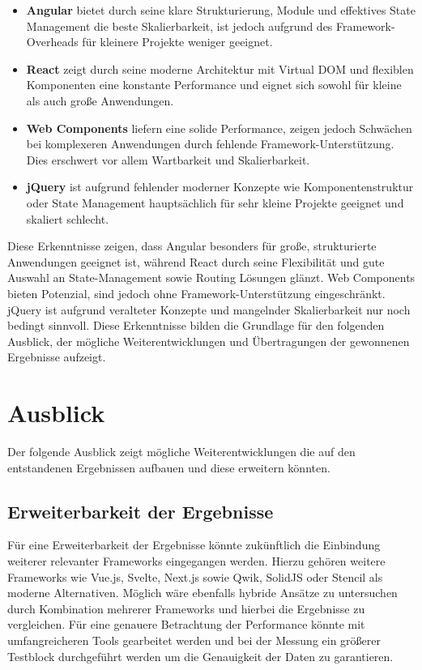 \documentclass[oneside]{ausarbeitung}
\begin{document}
\begin{itemize}
    \item \textbf{Angular} bietet durch seine klare Strukturierung, Module und effektives State Management die beste Skalierbarkeit, ist jedoch aufgrund des Framework-Overheads für kleinere Projekte weniger geeignet.
    \item \textbf{React} zeigt durch seine moderne Architektur mit Virtual DOM und flexiblen Komponenten eine konstante Performance und eignet sich sowohl für kleine als auch große Anwendungen.
    \item \textbf{Web Components} liefern eine solide Performance, zeigen jedoch Schwächen bei komplexeren Anwendungen durch fehlende Framework-Unterstützung. Dies erschwert vor allem Wartbarkeit und Skalierbarkeit.
    \item \textbf{jQuery} ist aufgrund fehlender moderner Konzepte wie Komponentenstruktur oder State Management hauptsächlich für sehr kleine Projekte geeignet und skaliert schlecht.
\end{itemize}

Diese Erkenntnisse zeigen, dass Angular besonders für große, strukturierte Anwendungen geeignet ist, während React durch seine Flexibilität und gute Auswahl an State-Management sowie Routing Lösungen glänzt. Web Components bieten Potenzial, sind jedoch ohne Framework-Unterstützung eingeschränkt. jQuery ist aufgrund veralteter Konzepte und mangelnder Skalierbarkeit nur noch bedingt sinnvoll. Diese Erkenntnisse bilden die Grundlage für den folgenden Ausblick, der mögliche Weiterentwicklungen und Übertragungen der gewonnenen Ergebnisse aufzeigt.

\section{Ausblick}
\label{sec:ausblick}

Der folgende Ausblick zeigt mögliche Weiterentwicklungen die auf den entstandenen Ergebnissen aufbauen und diese erweitern könnten.

\subsection{Erweiterbarkeit der Ergebnisse}
\label{sub:erweiterbarkeit}

Für eine Erweiterbarkeit der Ergebnisse könnte zukünftlich die Einbindung weiterer relevanter Frameworks eingegangen werden. Hierzu gehören weitere Frameworks wie Vue.js, Svelte, Next.js sowie Qwik, SolidJS oder Stencil als moderne Alternativen. Möglich wäre ebenfalls hybride Ansätze zu untersuchen durch Kombination mehrerer Frameworks und hierbei die Ergebnisse zu vergleichen. Für eine genauere Betrachtung der Performance könnte mit umfangreicheren Tools gearbeitet werden und bei der Messung ein größerer Testblock durchgeführt werden um die Genauigkeit der Daten zu garantieren. 
\end{document}
